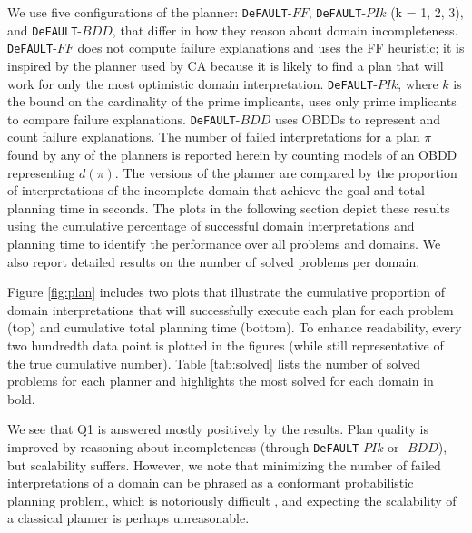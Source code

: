 \documentclass{article}
\def\citep#1{\cite{#1}}
\def\und#1{\noindent{\bf #1}:}
\def\FFRISKY{{\tt DeFAULT}}
\def\und#1{\medskip{\noindent\bf #1:}}
\begin{document}


We use five configurations of the planner: \FFRISKY{}-$FF$, \FFRISKY{}-$PIk$ (k = 1, 2, 3), and \FFRISKY{}-$BDD$, that differ in how they reason about domain incompleteness.  \FFRISKY{}-$FF$ does not compute failure explanations and uses the FF heuristic;  it is inspired by the planner used by CA because it is likely to find a plan that will work for only the most optimistic domain interpretation.  \FFRISKY{}-$PIk$, where $k$ is the bound on the cardinality of the prime implicants, uses only prime implicants to compare failure explanations.  \FFRISKY{}-$BDD$ uses OBDDs to represent and count failure explanations.  The number of failed interpretations for a plan $\pi$ found by any of the planners is reported herein by counting models of an OBDD representing $d(\pi)$.
The versions of the planner are compared by the proportion of interpretations of the incomplete domain that achieve the goal and total planning time in seconds.  
The plots in the following section depict these results using the cumulative percentage of successful domain interpretations and planning time to identify the performance over all problems and domains.  We also report detailed results on the number of solved problems per domain. 

\und{Off-line Planning Results} Figure \ref{fig:plan} includes two plots that illustrate the cumulative proportion of domain interpretations that will successfully execute each plan for each problem (top) and cumulative total planning time (bottom).  To enhance readability, every two hundredth data point is plotted in the figures (while still representative of the true cumulative number).  Table \ref{tab:solved} lists the number of solved problems for each planner and highlights the most solved for each domain in bold.  

We see that Q1 is answered mostly positively by the results.  Plan quality is improved by reasoning about incompleteness (through \FFRISKY{}-$PIk$ or -$BDD$), but scalability suffers.  However, we note that minimizing the number of failed interpretations of a domain can be phrased as a conformant probabilistic planning problem, which is notoriously difficult \citep{pff,aij-mclug}, and expecting the scalability of a classical planner is perhaps unreasonable.  
\end{document}
